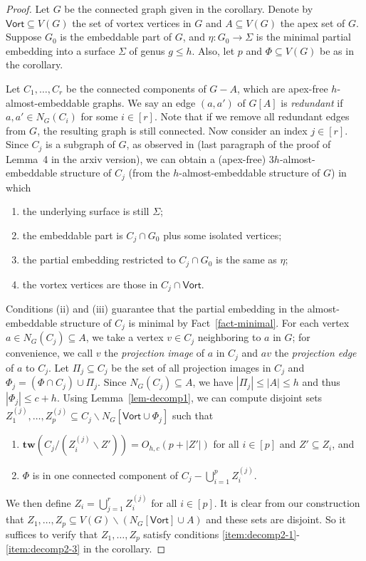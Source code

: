 \documentclass[a4paper,11pt]{article}
\numberwithin{lemma}{section}
\newcommand{\tw}{\mathbf{tw}}
\begin{document}
\begin{proof}
Let $G$ be the connected graph given in the corollary.
Denote by $\mathsf{Vort} \subseteq V(G)$ the set of vortex vertices in $G$ and $A \subseteq V(G)$ the apex set of $G$.
Suppose $G_0$ is the embeddable part of $G$, and $\eta: G_0 \rightarrow \varSigma$ is the minimal partial embedding into a surface $\varSigma$ of genus $g \leq h$.
Also, let $p$ and $\varPhi \subseteq V(G)$ be as in the corollary.

Let $C_1,\dots,C_r$ be the connected components of $G-A$, which are apex-free $h$-almost-embeddable graphs.
We say an edge $(a,a')$ of $G[A]$ is \emph{redundant} if $a,a' \in N_G(C_i)$ for some $i \in [r]$.
Note that if we remove all redundant edges from $G$, the resulting graph is still connected.
Now consider an index $j \in [r]$.
Since $C_j$ is a subgraph of $G$, as observed in \cite{BandyapadhyayLLSJ22} (last paragraph of the proof of Lemma~4 in the arxiv version), we can obtain a (apex-free) $3h$-almost-embeddable structure of $C_j$ (from the $h$-almost-embeddable structure of $G$) in which
\begin{enumerate}[label = (\roman*)]
    \item the underlying surface is still $\varSigma$;
    \item the embeddable part is $C_j \cap G_0$ plus some isolated vertices;
    \item the partial embedding restricted to $C_j \cap G_0$ is the same as $\eta$;
    \item the vortex vertices are those in $C_j \cap \mathsf{Vort}$.
\end{enumerate}
Conditions (ii) and (iii) guarantee that the partial embedding in the almost-embeddable structure of $C_j$ is minimal by Fact~\ref{fact-minimal}.
For each vertex $a \in N_G(C_j) \subseteq A$, we take a vertex $v \in C_j$ neighboring to $a$ in $G$; for convenience, we call $v$ the \emph{projection image} of $a$ in $C_j$ and $av$ the \emph{projection edge} of $a$ to $C_j$.
Let $\varPi_j \subseteq C_j$ be the set of all projection images in $C_j$ and $\varPhi_j = (\varPhi \cap C_j) \cup \varPi_j$.
Since $N_G(C_j) \subseteq A$, we have $|\varPi_j| \leq |A| \leq h$ and thus $|\varPhi_j| \leq c+h$.
Using Lemma~\ref{lem-decomp1}, we can compute disjoint sets $Z_1^{(j)},\dots,Z_p^{(j)} \subseteq C_j \backslash N_G[\mathsf{Vort} \cup \varPhi_j]$ such that\
\begin{enumerate}[label = (\arabic*)]
 \item $\tw(C_j/(Z_i^{(j)} \backslash Z')) = O_{h,c}(p+|Z'|)$ for all $i \in [p]$ and $Z' \subseteq Z_i$, and
 \item $\varPhi$ is in one connected component of $C_j - \bigcup_{i=1}^p Z_i^{(j)}$.
\end{enumerate}
We then define $Z_i = \bigcup_{j=1}^r Z_i^{(j)}$ for all $i \in [p]$.
It is clear from our construction that $Z_1,\dots,Z_p \subseteq V(G) \backslash (N_G[\mathsf{Vort}] \cup A)$ and these sets are disjoint.
So it suffices to verify that $Z_1,\dots,Z_p$ satisfy conditions \ref{item:decomp2-1}-\ref{item:decomp2-3} in the corollary.


\end{proof}
\end{document}
